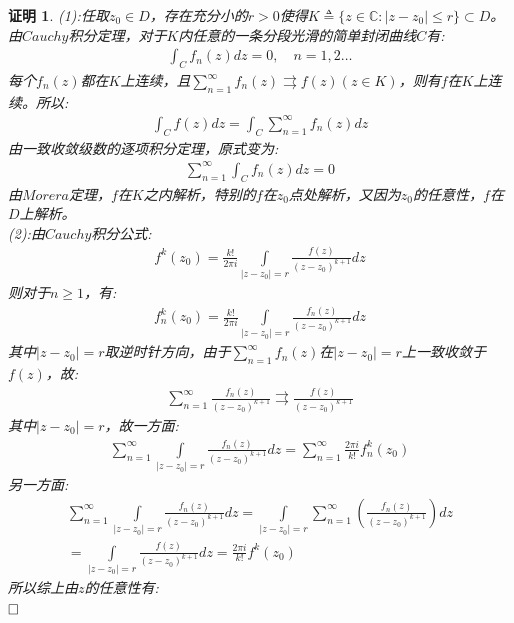 \documentclass{ctexart}
\newcommand{\。}{．} %
\newenvironment{lanse}{
    \begin{tcolorbox}[breakable,enhanced, colback=qlan, boxrule=0pt, frame hidden,
        borderline west={0.7mm}{0.1mm}{slan}]
    }
    {\end{tcolorbox}}
\theoremstyle{t} %
\newtheorem*{zmhj}{\color{slan} 证明}
\newenvironment{zm}{\begin{lanse}\begin{zmhj}}{$\hfill \square$\end{zmhj}\end{lanse}}
\begin{document}
\begin{zm}
    (1):任取$z_0\in D$，存在充分小的$r>0$使得$K\triangleq \{z\in\mathbb{C}:|z-z_0|\le r\}\subset D$。由$Cauchy$积分定理，对于$K$内任意的一条分段光滑的简单封闭曲线$C$有:
    \begin{align*}
        \int_{C}f_{n}(z)dz=0,\quad n=1,2\dots
    \end{align*}
    每个$f_{n}(z)$都在$K$上连续，且$\sum_{n=1}^{\infty}f_{n}(z)\rightrightarrows f(z)(z\in K)$，则有$f$在$K$上连续。所以:
    \begin{align*}
        \int_{C}f(z)dz=\int_{C}\sum_{n=1}^{\infty}f_{n}(z)dz
    \end{align*}
    由一致收敛级数的逐项积分定理，原式变为:
    \begin{align*}
        \sum_{n=1}^{\infty}\int_{C}f_{n}(z)dz=0
    \end{align*}
    由$Morera$定理，$f$在$K$之内解析，特别的$f$在$z_0$点处解析，又因为$z_0$的任意性，$f$在$D$上解析。\\
    (2):由$Cauchy$积分公式:
    \begin{align*}
        f^{k}(z_0)=\frac{k!}{2\pi i}\int\limits_{|z-z_0|=r}\frac{f(z)}{(z-z_0)^{k+1}}dz
    \end{align*}
    则对于$n\ge 1$，有:
    \begin{align*}
        f^{k}_{n}(z_0)=\frac{k!}{2\pi i}\int\limits_{|z-z_0|=r}\frac{f_{n}(z)}{(z-z_0)^{k+1}}dz
    \end{align*}
    其中$|z-z_0|=r$取逆时针方向，由于$\sum_{n=1}^{\infty}f_{n}(z)$在$|z-z_0|=r$上一致收敛于$f(z)$，故:
    \begin{align*}
        \sum_{n=1}^{\infty}\frac{f_{n}(z)}{(z-z_0)^{k+1}}\rightrightarrows \frac{f(z)}{(z-z_0)^{k+1}}
    \end{align*}
    其中$|z-z_0|=r$，故一方面:
    \begin{align*}
        \sum_{n=1}^{\infty}\int\limits_{|z-z_0|=r}\frac{f_{n}(z)}{(z-z_0)^{k+1}}dz=\sum_{n=1}^{\infty}\frac{2\pi i}{k!}f^{k}_{n}(z_0)
    \end{align*}
    另一方面:
    \begin{align*}
        \sum_{n=1}^{\infty}\int\limits_{|z-z_0|=r}\frac{f_{n}(z)}{(z-z_0)^{k+1}}dz=\int\limits_{|z-z_0|=r}\sum_{n=1}^{\infty}\left(\frac{f_{n}(z)}{(z-z_0)^{k+1}}\right)dz\\
        =\int\limits_{|z-z_0|=r}\frac{f(z)}{(z-z_0)^{k+1}}dz=\frac{2\pi i}{k!}f^{k}(z_0)
    \end{align*}
    所以综上由$z$的任意性有:
    \begin{align*}

\end{align*}
\end{zm}
\end{document}
